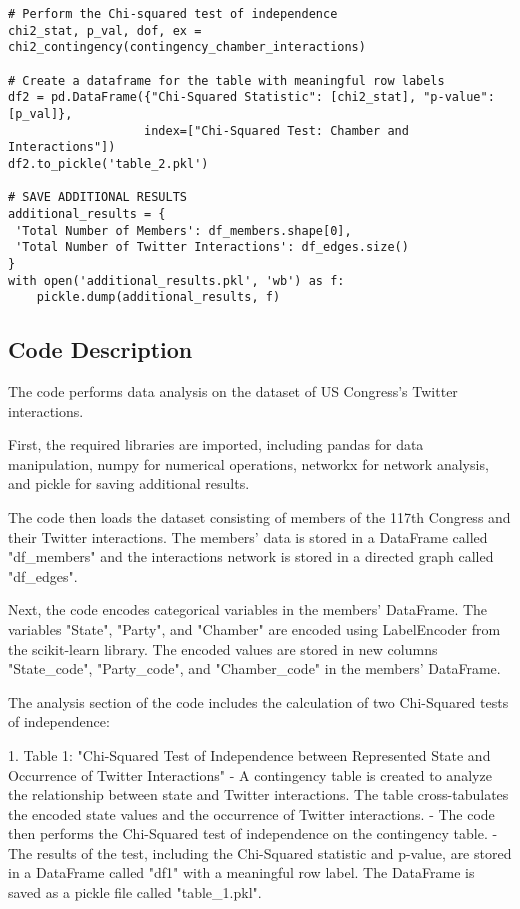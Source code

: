 \documentclass[11pt]{article}
\begin{document}
\begin{verbatim}
# Perform the Chi-squared test of independence
chi2_stat, p_val, dof, ex = chi2_contingency(contingency_chamber_interactions)

# Create a dataframe for the table with meaningful row labels
df2 = pd.DataFrame({"Chi-Squared Statistic": [chi2_stat], "p-value": [p_val]}, 
                   index=["Chi-Squared Test: Chamber and Interactions"])
df2.to_pickle('table_2.pkl')

# SAVE ADDITIONAL RESULTS
additional_results = {
 'Total Number of Members': df_members.shape[0], 
 'Total Number of Twitter Interactions': df_edges.size()
}
with open('additional_results.pkl', 'wb') as f:
    pickle.dump(additional_results, f)

\end{verbatim}

\subsection{Code Description}

The code performs data analysis on the dataset of US Congress's Twitter interactions. 

First, the required libraries are imported, including pandas for data manipulation, numpy for numerical operations, networkx for network analysis, and pickle for saving additional results.

The code then loads the dataset consisting of members of the 117th Congress and their Twitter interactions. The members' data is stored in a DataFrame called "df\_members" and the interactions network is stored in a directed graph called "df\_edges".

Next, the code encodes categorical variables in the members' DataFrame. The variables "State", "Party", and "Chamber" are encoded using LabelEncoder from the scikit-learn library. The encoded values are stored in new columns "State\_code", "Party\_code", and "Chamber\_code" in the members' DataFrame.

The analysis section of the code includes the calculation of two Chi-Squared tests of independence:

1. Table 1: "Chi-Squared Test of Independence between Represented State and Occurrence of Twitter Interactions"
   - A contingency table is created to analyze the relationship between state and Twitter interactions. The table cross-tabulates the encoded state values and the occurrence of Twitter interactions.
   - The code then performs the Chi-Squared test of independence on the contingency table.
   - The results of the test, including the Chi-Squared statistic and p-value, are stored in a DataFrame called "df1" with a meaningful row label. The DataFrame is saved as a pickle file called "table\_1.pkl".
\end{document}
